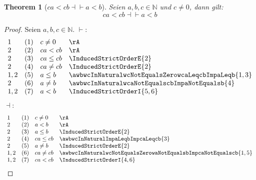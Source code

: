 \documentclass{book}
\theoremstyle{plain}
\newtheorem{theorem}{Theorem}
\theoremstyle{remark}
\theoremstyle{definition}
\begin{document}
\label{awbwcInNaturalwcNotEqualsZerowcaLneqcbEqvaLneqb}
\begin{theorem}[\(ca<cb\dashv\vdash a<b\)]
Seien \(a,b,c\in\mathbb{N}\) und \(c\neq 0\), dann gilt:
\[ca<cb\dashv\vdash a<b\]
\end{theorem}
\begin{proof}
Seien \(a,b,c\in\mathbb{N}\).
\(\vdash\):
       \[
	\begin{array}{lllcll}
            1       &  (1)  & \multicolumn{3}{l}{c\neq 0} & \rA \\
            2       &  (2)  & \multicolumn{3}{l}{ca<cb} & \rA \\
            2       &  (3)  & \multicolumn{3}{l}{ca\leq cb} & \InducedStrictOrderE{2} \\
            2       &  (4)  & \multicolumn{3}{l}{ca\neq cb} & \InducedStrictOrderE{2} \\
            1,2     &  (5)  & \multicolumn{3}{l}{a\leq b} & \awbwcInNaturalwcNotEqualsZerowcaLeqcbImpaLeqb{1,3} \\
            2     &  (6)  & \multicolumn{3}{l}{a\neq b} & \awbwcInNaturalwcaNotEqualscbImpaNotEqualsb{4} \\
            1,2     &  (7)  & \multicolumn{3}{l}{a<b} & \InducedStrictOrderI{5,6} \\
	\end{array}
        \]
\(\dashv\):
       \[
	\begin{array}{lllcll}
            1       &  (1)  & \multicolumn{3}{l}{c\neq 0} & \rA \\
            2       &  (2)  & \multicolumn{3}{l}{a<b} & \rA \\
            2       &  (3)  & \multicolumn{3}{l}{a\leq b} & \InducedStrictOrderE{2} \\
            2       &  (4)  & \multicolumn{3}{l}{ca\leq cb} & \awbwcInNaturalImpaLeqbImpcaLeqcb{3} \\
            2       &  (5)  & \multicolumn{3}{l}{a\neq b} & \InducedStrictOrderE{2} \\
            1,2       &  (6)  & \multicolumn{3}{l}{ca\neq cb} & \awbwcInNaturalwcNotEqualsZerowaNotEqualsbImpcaNotEqualscb{1,5} \\
            1,2       &  (7)  & \multicolumn{3}{l}{ca<cb} & \InducedStrictOrderI{4,6} \\
	\end{array}
        \]
\end{proof}
\end{document}
